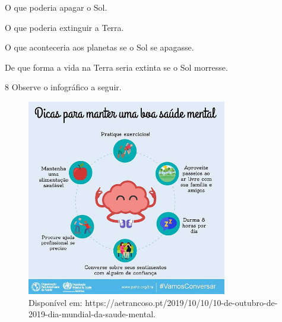 \begin{escolha}
\item O que poderia apagar o Sol.
\item O que poderia extinguir a Terra.
\item O que aconteceria aos planetas se o Sol se apagasse.
\item De que forma a vida na Terra seria extinta se o Sol morresse.
\end{escolha}



\num{8} Observe o infográfico a seguir.

\begin{figure}[H]
\centering\includegraphics[width=3.43333in,height=3.37681in]{./imgSAEB_6_POR/media/image15.jpeg}
\caption{Disponível em: https://aetrancoso.pt/2019/10/10/10-de-outubro-de-2019-dia-mundial-da-saude-mental.}
\end{figure}

